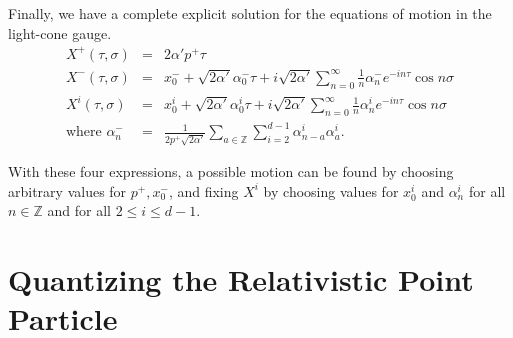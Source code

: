 \documentclass[a4paper,12pt]{article}
\numberwithin{equation}{section}
\begin{document}
Finally, we have a complete explicit solution for the equations of motion in the light-cone gauge.
\begin{eqnarray}
X^+(\tau, \sigma) &=& 2\alpha'p^+ \tau \\
X^-(\tau, \sigma) &=& x_0^- + \sqrt{2\alpha'} \alpha_0^- \tau + i\sqrt{2\alpha'}\sum_{n=0}^\infty \frac{1}{n} \alpha_n^- e^{-in\tau} \cos n\sigma\\
X^i (\tau, \sigma) &=& x_0^i + \sqrt{2\alpha'} \alpha_0^i \tau + i\sqrt{2\alpha'}\sum_{n=0}^\infty \frac{1}{n} \alpha_n^i e^{-in\tau} \cos n\sigma\\
\text{where} \,\, \alpha^-_n&=& \frac{1}{2p^+\sqrt{2\alpha'}}\sum_{a \in \mathbb{Z}}\sum_{i=2}^{d-1}\alpha^i_{n-a}\alpha^i_a.
\end{eqnarray}

With these four expressions, a possible motion can be found by choosing arbitrary values for $p^+, x_0^-$, and fixing $X^i$ by choosing values for $x_0^i$ and $\alpha_n^i$ for all $n \in \mathbb{Z}$ and for all $2\leq i\leq d-1$.
\section{Quantizing the Relativistic Point Particle}\label{secpoint}
\end{document}
